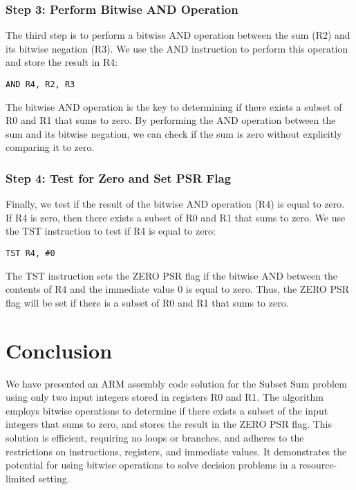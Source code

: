 \begin{thebibliography}{9}
\subsubsection{Step 3: Perform Bitwise AND Operation}

The third step is to perform a bitwise AND operation between the sum (R2) and its bitwise negation (R3). We use the AND instruction to perform this operation and store the result in R4:

\begin{verbatim}
AND R4, R2, R3
\end{verbatim}

The bitwise AND operation is the key to determining if there exists a subset of R0 and R1 that sums to zero. By performing the AND operation between the sum and its bitwise negation, we can check if the sum is zero without explicitly comparing it to zero.

\subsubsection{Step 4: Test for Zero and Set PSR Flag}

Finally, we test if the result of the bitwise AND operation (R4) is equal to zero. If R4 is zero, then there exists a subset of R0 and R1 that sums to zero. We use the TST instruction to test if R4 is equal to zero:

\begin{verbatim}
TST R4, #0
\end{verbatim}

The TST instruction sets the ZERO PSR flag if the bitwise AND between the contents of R4 and the immediate value 0 is equal to zero. Thus, the ZERO PSR flag will be set if there is a subset of R0 and R1 that sums to zero.

\section{Conclusion}

We have presented an ARM assembly code solution for the Subset Sum problem using only two input integers stored in registers R0 and R1. The algorithm employs bitwise operations to determine if there exists a subset of the input integers that sums to zero, and stores the result in the ZERO PSR flag. This solution is efficient, requiring no loops or branches, and adheres to the restrictions on instructions, registers, and immediate values. It demonstrates the potential for using bitwise operations to solve decision problems in a resource-limited setting.


\end{thebibliography}
